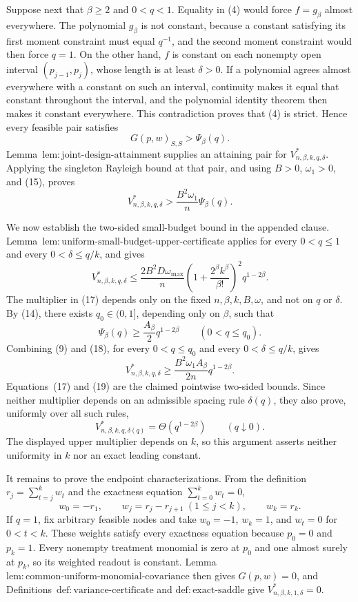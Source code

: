 Suppose next that \(\beta\ge2\) and \(0<q<1\).  Equality in (4) would force \(f=g_\beta\) almost everywhere.  The polynomial \(g_\beta\) is not constant, because a constant satisfying its first moment constraint must equal \(q^{-1}\), and the second moment constraint would then force \(q=1\).  On the other hand, \(f\) is constant on each nonempty open interval \((p_{j-1},p_j)\), whose length is at least \(\delta>0\).  If a polynomial agrees almost everywhere with a constant on such an interval, continuity makes it equal that constant throughout the interval, and the polynomial identity theorem then makes it constant everywhere.  This contradiction proves that (4) is strict.  Hence every feasible pair satisfies
\[
G(p,w)_{S,S}>\Psi_\beta(q).
\tag{15}
\]
Lemma~\(\mathrm{lem{:}joint\text{-}design\text{-}attainment}\) supplies an attaining pair for \(V^*_{n,\beta,k,q,\delta}\).  Applying the singleton Rayleigh bound at that pair, and using \(B>0\), \(\omega_1>0\), and (15), proves
\[
V^*_{n,\beta,k,q,\delta}>
\frac{B^2\omega_1}{n}\Psi_\beta(q).
\tag{16}
\]

We now establish the two-sided small-budget bound in the appended clause.  Lemma~\(\mathrm{lem{:}uniform\text{-}small\text{-}budget\text{-}upper\text{-}certificate}\) applies for every \(0<q\le1\) and every \(0<\delta\le q/k\), and gives
\[
V^*_{n,\beta,k,q,\delta}
\le \frac{2B^2D\omega_{\max}}{n}
\left(1+\frac{2^\beta k^\beta}{\beta!}\right)^2q^{1-2\beta}.
\tag{17}
\]
The multiplier in (17) depends only on the fixed \(n,\beta,k,B,\omega\), and not on \(q\) or \(\delta\).  By (14), there exists \(q_0\in(0,1]\), depending only on \(\beta\), such that
\[
\Psi_\beta(q)\ge \frac{A_\beta}{2}q^{1-2\beta}
\qquad(0<q\le q_0).
\tag{18}
\]
Combining (9) and (18), for every \(0<q\le q_0\) and every \(0<\delta\le q/k\), gives
\[
V^*_{n,\beta,k,q,\delta}
\ge \frac{B^2\omega_1A_\beta}{2n}q^{1-2\beta}.
\tag{19}
\]
Equations~(17) and (19) are the claimed pointwise two-sided bounds.  Since neither multiplier depends on an admissible spacing rule \(\delta(q)\), they also prove, uniformly over all such rules,
\[
V^*_{n,\beta,k,q,\delta(q)}=\Theta(q^{1-2\beta})
\qquad(q\downarrow0).
\tag{20}
\]
The displayed upper multiplier depends on \(k\), so this argument asserts neither uniformity in \(k\) nor an exact leading constant.

It remains to prove the endpoint characterizations.  From the definition \(r_j=\sum_{t=j}^kw_t\) and the exactness equation \(\sum_{t=0}^kw_t=0\),
\[
w_0=-r_1,
\qquad w_j=r_j-r_{j+1}\ (1\le j<k),
\qquad w_k=r_k.
\tag{21}
\]
If \(q=1\), fix arbitrary feasible nodes and take \(w_0=-1\), \(w_k=1\), and \(w_t=0\) for \(0<t<k\).  These weights satisfy every exactness equation because \(p_0=0\) and \(p_k=1\).  Every nonempty treatment monomial is zero at \(p_0\) and one almost surely at \(p_k\), so its weighted readout is constant.  Lemma~\(\mathrm{lem{:}common\text{-}uniform\text{-}monomial\text{-}covariance}\) then gives \(G(p,w)=0\), and Definitions~\(\mathrm{def{:}variance\text{-}certificate}\) and \(\mathrm{def{:}exact\text{-}saddle}\) give \(V^*_{n,\beta,k,1,\delta}=0\).

